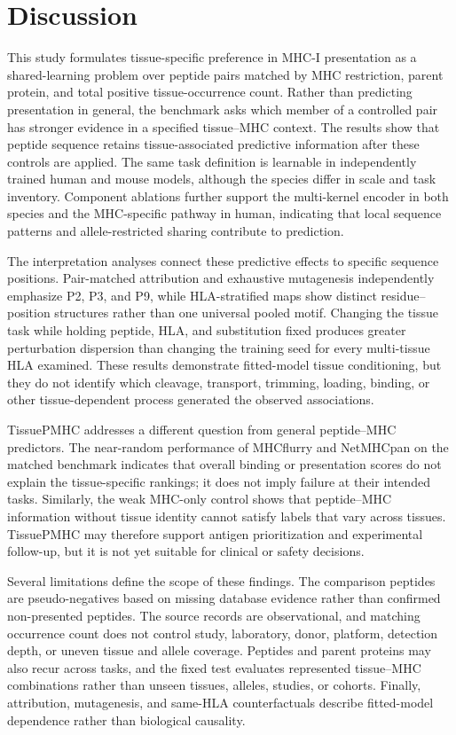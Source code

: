\section{Discussion}

This study formulates tissue-specific preference in MHC-I presentation as a shared-learning problem over peptide pairs matched by MHC restriction, parent protein, and total positive tissue-occurrence count. Rather than predicting presentation in general, the benchmark asks which member of a controlled pair has stronger evidence in a specified tissue--MHC context. The results show that peptide sequence retains tissue-associated predictive information after these controls are applied. The same task definition is learnable in independently trained human and mouse models, although the species differ in scale and task inventory. Component ablations further support the multi-kernel encoder in both species and the MHC-specific pathway in human, indicating that local sequence patterns and allele-restricted sharing contribute to prediction.

The interpretation analyses connect these predictive effects to specific sequence positions. Pair-matched attribution and exhaustive mutagenesis independently emphasize P2, P3, and P9, while HLA-stratified maps show distinct residue--position structures rather than one universal pooled motif. Changing the tissue task while holding peptide, HLA, and substitution fixed produces greater perturbation dispersion than changing the training seed for every multi-tissue HLA examined. These results demonstrate fitted-model tissue conditioning, but they do not identify which cleavage, transport, trimming, loading, binding, or other tissue-dependent process generated the observed associations.

TissuePMHC addresses a different question from general peptide--MHC predictors. The near-random performance of MHCflurry and NetMHCpan on the matched benchmark indicates that overall binding or presentation scores do not explain the tissue-specific rankings; it does not imply failure at their intended tasks. Similarly, the weak MHC-only control shows that peptide--MHC information without tissue identity cannot satisfy labels that vary across tissues. TissuePMHC may therefore support antigen prioritization and experimental follow-up, but it is not yet suitable for clinical or safety decisions.

Several limitations define the scope of these findings. The comparison peptides are pseudo-negatives based on missing database evidence rather than confirmed non-presented peptides. The source records are observational, and matching occurrence count does not control study, laboratory, donor, platform, detection depth, or uneven tissue and allele coverage. Peptides and parent proteins may also recur across tasks, and the fixed test evaluates represented tissue--MHC combinations rather than unseen tissues, alleles, studies, or cohorts. Finally, attribution, mutagenesis, and same-HLA counterfactuals describe fitted-model dependence rather than biological causality.

